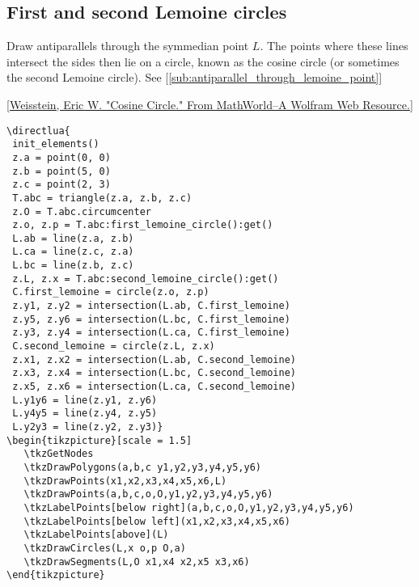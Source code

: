 
\subsection{First and second Lemoine circles} %
\label{sub:first_and_second_lemoine_circles}

Draw antiparallels through the symmedian point $L$. The points where these lines intersect the sides then lie on a circle, known as the cosine circle (or sometimes the second Lemoine circle). See  [\ref{sub:antiparallel_through_lemoine_point}]

[\href{https://mathworld.wolfram.com/CosineCircle.html}{Weisstein, Eric W. "Cosine Circle." From MathWorld--A Wolfram Web Resource.}]


\begin{verbatim}
\directlua{
 init_elements()
 z.a = point(0, 0)
 z.b = point(5, 0)
 z.c = point(2, 3)
 T.abc = triangle(z.a, z.b, z.c)
 z.O = T.abc.circumcenter
 z.o, z.p = T.abc:first_lemoine_circle():get()
 L.ab = line(z.a, z.b)
 L.ca = line(z.c, z.a)
 L.bc = line(z.b, z.c)
 z.L, z.x = T.abc:second_lemoine_circle():get()
 C.first_lemoine = circle(z.o, z.p)
 z.y1, z.y2 = intersection(L.ab, C.first_lemoine)
 z.y5, z.y6 = intersection(L.bc, C.first_lemoine)
 z.y3, z.y4 = intersection(L.ca, C.first_lemoine)
 C.second_lemoine = circle(z.L, z.x)
 z.x1, z.x2 = intersection(L.ab, C.second_lemoine)
 z.x3, z.x4 = intersection(L.bc, C.second_lemoine)
 z.x5, z.x6 = intersection(L.ca, C.second_lemoine)
 L.y1y6 = line(z.y1, z.y6)
 L.y4y5 = line(z.y4, z.y5)
 L.y2y3 = line(z.y2, z.y3)}
\begin{tikzpicture}[scale = 1.5]
   \tkzGetNodes
   \tkzDrawPolygons(a,b,c y1,y2,y3,y4,y5,y6)
   \tkzDrawPoints(x1,x2,x3,x4,x5,x6,L)
   \tkzDrawPoints(a,b,c,o,O,y1,y2,y3,y4,y5,y6)
   \tkzLabelPoints[below right](a,b,c,o,O,y1,y2,y3,y4,y5,y6)
   \tkzLabelPoints[below left](x1,x2,x3,x4,x5,x6)
   \tkzLabelPoints[above](L)
   \tkzDrawCircles(L,x o,p O,a)
   \tkzDrawSegments(L,O x1,x4 x2,x5 x3,x6)
\end{tikzpicture}
\end{verbatim}

